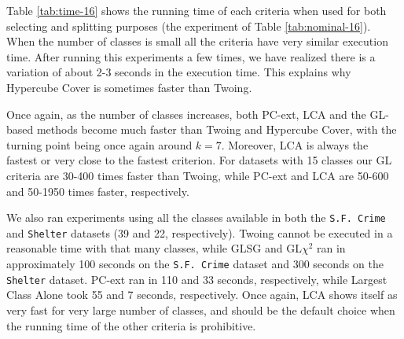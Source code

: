 Table \ref{tab:time-16} shows the running time of each criteria when used for both selecting and splitting purposes (the experiment of Table \ref{tab:nominal-16}).
When the number of classes is small all the criteria have very similar execution time. After running this experiments a few times, we have realized there is a variation of about 2-3 seconds in the execution time. This explains why Hypercube Cover is sometimes faster than Twoing.

Once again, as the number of classes increases, both PC-ext, LCA and the GL-based methods become much faster than Twoing and Hypercube Cover, with the turning point being once again around $k=7$. Moreover, LCA is always the fastest or very close to the fastest criterion. For datasets with 15 classes our GL criteria are 30-400 times faster than Twoing, while PC-ext and LCA are 50-600 and 50-1950 times faster, respectively.

We also ran experiments using all the classes available in both the {\tt S.F. Crime} and {\tt Shelter} datasets (39 and 22, respectively). Twoing cannot be executed in a reasonable time with that many classes, while GLSG and GL$\chi^2$ ran in approximately 100 seconds on the {\tt S.F. Crime} dataset and  300 seconds on the {\tt Shelter} dataset. PC-ext ran in 110 and 33 seconds, respectively, while Largest Class Alone took 55 and 7 seconds, respectively. Once again, LCA shows itself as very fast for very large number of classes, and should be the default choice when the running time of the other criteria is prohibitive.

